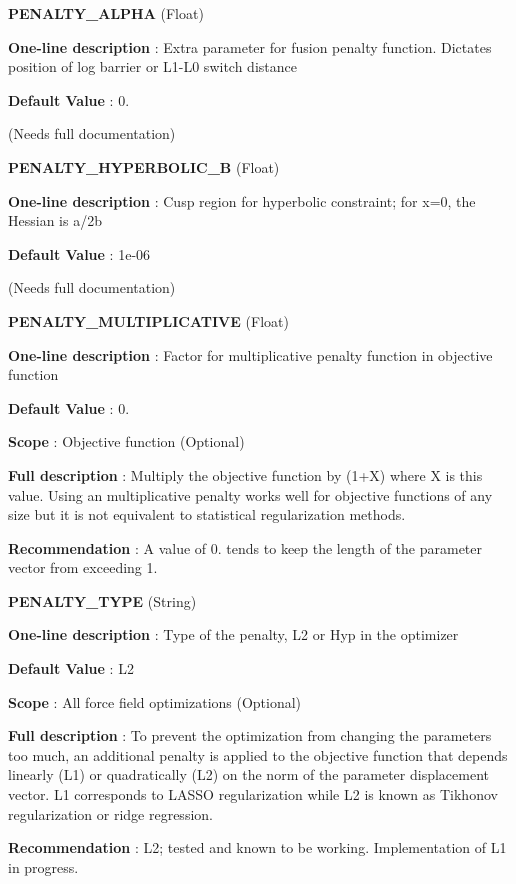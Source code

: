 \begin{DoxyItemize}
\item {\bfseries  \-P\-E\-N\-A\-L\-T\-Y\-\_\-\-A\-L\-P\-H\-A } (\-Float) \par
{\bfseries  \-One-\/line description }\-: \-Extra parameter for fusion penalty function. \-Dictates position of log barrier or \-L1-\/\-L0 switch distance \par
{\bfseries  \-Default \-Value }\-: 0. \par
(\-Needs full documentation)\end{DoxyItemize}
\begin{DoxyItemize}
\item {\bfseries  \-P\-E\-N\-A\-L\-T\-Y\-\_\-\-H\-Y\-P\-E\-R\-B\-O\-L\-I\-C\-\_\-\-B } (\-Float) \par
{\bfseries  \-One-\/line description }\-: \-Cusp region for hyperbolic constraint; for x=0, the \-Hessian is a/2b \par
{\bfseries  \-Default \-Value }\-: 1e-\/06 \par
(\-Needs full documentation)\end{DoxyItemize}
\begin{DoxyItemize}
\item {\bfseries  \-P\-E\-N\-A\-L\-T\-Y\-\_\-\-M\-U\-L\-T\-I\-P\-L\-I\-C\-A\-T\-I\-V\-E } (\-Float) \par
{\bfseries  \-One-\/line description }\-: \-Factor for multiplicative penalty function in objective function \par
{\bfseries  \-Default \-Value }\-: 0. \par
{\bfseries  \-Scope }\-: \-Objective function (\-Optional) \par
{\bfseries  \-Full description }\-: \-Multiply the objective function by (1+\-X) where \-X is this value. \-Using an multiplicative penalty works well for objective functions of any size but it is not equivalent to statistical regularization methods. \par
{\bfseries  \-Recommendation }\-: \-A value of 0. tends to keep the length of the parameter vector from exceeding 1.\end{DoxyItemize}
\begin{DoxyItemize}
\item {\bfseries  \-P\-E\-N\-A\-L\-T\-Y\-\_\-\-T\-Y\-P\-E } (\-String) \par
{\bfseries  \-One-\/line description }\-: \-Type of the penalty, \-L2 or \-Hyp in the optimizer \par
{\bfseries  \-Default \-Value }\-: \-L2 \par
{\bfseries  \-Scope }\-: \-All force field optimizations (\-Optional) \par
{\bfseries  \-Full description }\-: \-To prevent the optimization from changing the parameters too much, an additional penalty is applied to the objective function that depends linearly (\-L1) or quadratically (\-L2) on the norm of the parameter displacement vector. \-L1 corresponds to \-L\-A\-S\-S\-O regularization while \-L2 is known as \-Tikhonov regularization or ridge regression. \par
{\bfseries  \-Recommendation }\-: \-L2; tested and known to be working. \-Implementation of \-L1 in progress.\end{DoxyItemize}
